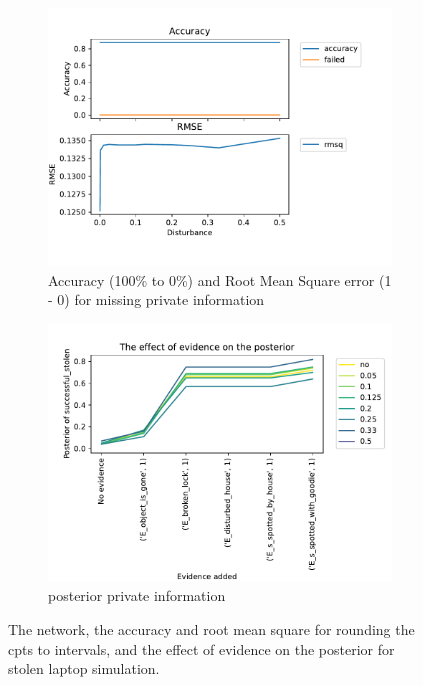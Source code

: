 \begin{figure}[h]
\begin{subfigure}{.45\textwidth}
\includegraphics[width=\linewidth]{../experiments/StolenLaptopPrivate/plots/performance_StolenLaptopPrivate.pdf}
\caption{Accuracy (100\% to 0\%) and Root Mean Square error (1 - 0) for missing private information}
\label{privatelaptopAcc}
\end{subfigure}

\begin{subfigure}{.45\textwidth}
\includegraphics[width=\linewidth]{../experiments/StolenLaptopPrivate/plots/posterior_StolenLaptopPrivate.pdf}
\caption{posterior private information}
\label{privatelaptoppost}
\end{subfigure}

\caption{The network, the accuracy and root mean square for rounding the cpts to intervals, and the effect of evidence on the posterior for stolen laptop simulation.}
\label{private}

\end{figure}



